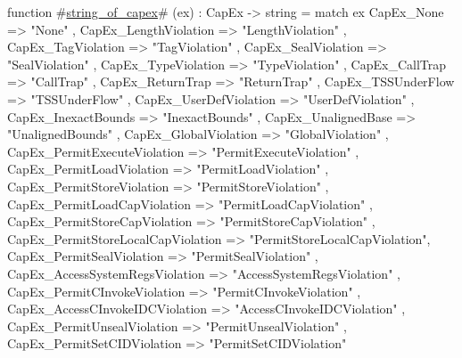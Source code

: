 function #\hyperref[sailRISCVzstringzyofzycapex]{string\_of\_capex}# (ex) : CapEx -> string =
  match ex {
    CapEx_None                          => "None"                        ,
    CapEx_LengthViolation               => "LengthViolation"             ,
    CapEx_TagViolation                  => "TagViolation"                ,
    CapEx_SealViolation                 => "SealViolation"               ,
    CapEx_TypeViolation                 => "TypeViolation"               ,
    CapEx_CallTrap                      => "CallTrap"                    ,
    CapEx_ReturnTrap                    => "ReturnTrap"                  ,
    CapEx_TSSUnderFlow                  => "TSSUnderFlow"                ,
    CapEx_UserDefViolation              => "UserDefViolation"            ,
    CapEx_InexactBounds                 => "InexactBounds"               ,
    CapEx_UnalignedBase                 => "UnalignedBounds"             ,
    CapEx_GlobalViolation               => "GlobalViolation"             ,
    CapEx_PermitExecuteViolation        => "PermitExecuteViolation"      ,
    CapEx_PermitLoadViolation           => "PermitLoadViolation"         ,
    CapEx_PermitStoreViolation          => "PermitStoreViolation"        ,
    CapEx_PermitLoadCapViolation        => "PermitLoadCapViolation"      ,
    CapEx_PermitStoreCapViolation       => "PermitStoreCapViolation"     ,
    CapEx_PermitStoreLocalCapViolation  => "PermitStoreLocalCapViolation",
    CapEx_PermitSealViolation           => "PermitSealViolation"         ,
    CapEx_AccessSystemRegsViolation     => "AccessSystemRegsViolation"   ,
    CapEx_PermitCInvokeViolation        => "PermitCInvokeViolation"      ,
    CapEx_AccessCInvokeIDCViolation     => "AccessCInvokeIDCViolation"   ,
    CapEx_PermitUnsealViolation         => "PermitUnsealViolation"       ,
    CapEx_PermitSetCIDViolation         => "PermitSetCIDViolation"
  }
